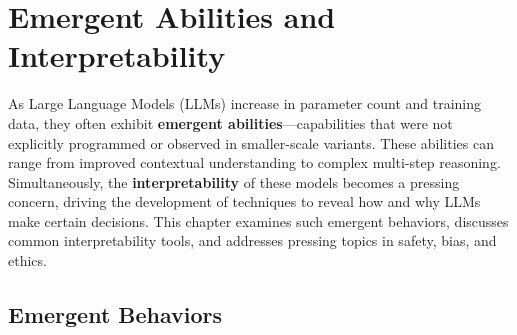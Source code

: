 \chapter{Emergent Abilities and Interpretability}
\label{chap:emergent_interpretability}

\noindent
As Large Language Models (LLMs) increase in parameter count and training data, they often exhibit \textbf{emergent abilities}—capabilities that were not explicitly programmed or observed in smaller-scale variants. These abilities can range from improved contextual understanding to complex multi-step reasoning. Simultaneously, the \textbf{interpretability} of these models becomes a pressing concern, driving the development of techniques to reveal how and why LLMs make certain decisions. This chapter examines such emergent behaviors, discusses common interpretability tools, and addresses pressing topics in safety, bias, and ethics.

\section{Emergent Behaviors}
\label{sec:emergent_behaviors}


